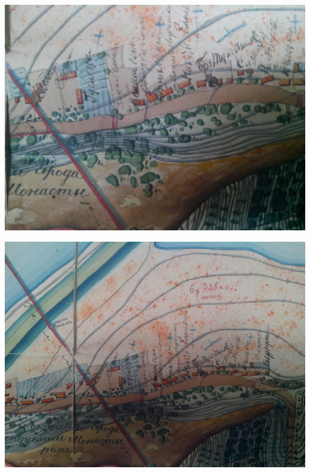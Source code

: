 \begin{center}
\includegraphics[width=\linewidth]{chast-vosp/zver/IMG_20170627_153934.jpg}
\end{center}

\begin{center}
\includegraphics[width=\linewidth]{chast-vosp/zver/IMG_20170627_154047.jpg}
\end{center}

